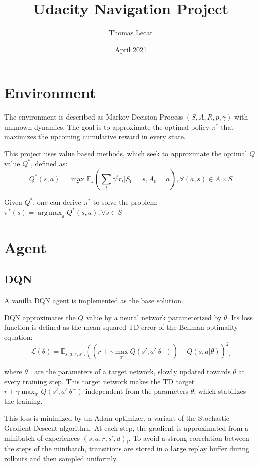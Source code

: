 \documentclass{article}
\title{Udacity Navigation Project}
\author{Thomas Lecat}
\date{April 2021}
\DeclareMathOperator*{\argmax}{arg\,max}
\begin{document}
    \maketitle

    \section{Environment}\label{sec:environment}

    The environment is described as Markov Decision Process $(S, A, R, p, \gamma)$ with unknown dynamics.
    The goal is to approximate the optimal policy $\pi^*$ that maximizes the upcoming cumulative reward in every state.

    This project uses value based methods, which seek to approximate the optimal $Q$ value $Q^*$, defined as:
    \[
    Q^*(s, a) = \max_{\pi} \mathbb{E}_{\pi} (\sum_{t} \gamma^t r_t | S_0=s, A_0=a),  \forall (a, s) \in A \times S
    \]

    Given $Q^*$, one can derive $\pi^*$ to solve the problem:
    $\pi^*(s) = \argmax_a Q^*(s, a), \forall s \in S$

    \section{Agent}\label{sec:agent}

    \subsection{DQN}\label{subsec:dqn}


    A vanilla \href{https://storage.googleapis.com/deepmind-media/dqn/DQNNaturePaper.pdf}{DQN} agent
    is implemented as the base solution.

    DQN approximates the $Q$ value by a neural network parameterized by $\theta$.
    Its loss function is defined as the mean squared TD error of the Bellman optimality equation:
    \[
    \mathcal{L}(\theta) = \mathbb{E}_{s, a, r, s'} \big[((r + \gamma \max_{a'} Q(s', a' | \theta^-)) - Q(s, a | \theta))^2\big]
    \]

    where $\theta^-$ are the parameters of a target network, slowly updated towards $\theta$ at every training step.
    This target network makes the TD target $r + \gamma \max_{a'} Q(s', a' | \theta^-)$ independent from the parameters $\theta$,
    which stabilizes the training.

    This loss is minimized by an Adam optimizer, a variant of the Stochastic Gradient Descent algorithm.
    At each step, the gradient is approximated from a minibatch of experiences ${(s, a, r, s', d)_i}$.
    To avoid a strong correlation between the steps of the minibatch, transitions are stored in a large replay buffer
    during rollouts and then sampled uniformly.
\end{document}
